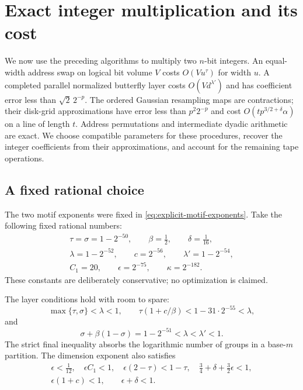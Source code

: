 \section{Exact integer multiplication and its cost}
\label{sec:assembly}

We now use the preceding algorithms to multiply two $n$-bit integers.
An equal-width address swap on logical bit volume $V$ costs
$O(Vu^\tau)$ for width $u$.  A completed parallel normalized butterfly
layer costs $O(Vd^{\lambda'})$ and has coefficient error less than
$\sqrt2\,2^{-p}$.  The ordered Gaussian resampling maps are
contractions; their disk-grid approximations have error less than
$p^2 2^{-p}$ and cost $O(tp^{3/2+\delta}\alpha)$ on a line of length
$t$.  Address permutations and intermediate dyadic arithmetic are
exact.  We choose compatible parameters for these procedures, recover
the integer coefficients from their approximations, and account for the
remaining tape operations.

\subsection{A fixed rational choice}

The two motif exponents were fixed in \eqref{eq:explicit-motif-exponents}.
Take the following fixed rational numbers:
\begin{equation}\label{eq:fixed-parameters}
\begin{gathered}
 \tau=\sigma=1-2^{-50},\qquad \beta=\frac12,\qquad \delta=\frac1{16},\\
 \lambda=1-2^{-52},\qquad c=2^{-56},\qquad
 \lambda'=1-2^{-54},\\
 C_1=20,\qquad \epsilon=2^{-75},\qquad \kappa=2^{-182}.
\end{gathered}
\end{equation}
These constants are deliberately conservative; no optimization is claimed.

The layer conditions hold with room to spare:
\[
 \max\{\tau,\sigma\}<\lambda<1,\qquad
 \tau(1+c/\beta)<1-31\cdot2^{-55}<\lambda,
\]
and
\[
 \sigma+\beta(1-\sigma)=1-2^{-51}<\lambda<\lambda'<1.
\]
The strict final inequality absorbs the logarithmic number of groups in
a base-$m$ partition.  The dimension exponent also satisfies
\[
\begin{gathered}
 \epsilon<\frac1{12},\quad \epsilon C_1<1,\quad
 \epsilon(2-\tau)<1-\tau,\quad
 \frac34+\delta+\frac32\epsilon<1,\\
 \epsilon(1+c)<1,\qquad \epsilon+\delta<1.
\end{gathered}
\]

